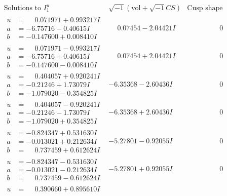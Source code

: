 \documentclass[1p]{elsarticle_modified}
\theoremstyle{definition}
\newcommand{\I}{\sqrt{-1}}
\begin{document}
$$\begin{array}{c|c|c}  
\text{Solutions to }I^u_{1}& \I (\text{vol} + \sqrt{-1}CS) & \text{Cusp shape}\\
 \hline 
\begin{aligned}
u &= \phantom{-}0.071971 + 0.993217 I \\
a &= -6.75716 - 0.40615 I \\
b &= -0.147600 + 0.008410 I\end{aligned}
 & \phantom{-}0.07454 - 2.04421 I & \phantom{-0.000000 } 0 \\ \hline\begin{aligned}
u &= \phantom{-}0.071971 - 0.993217 I \\
a &= -6.75716 + 0.40615 I \\
b &= -0.147600 - 0.008410 I\end{aligned}
 & \phantom{-}0.07454 + 2.04421 I & \phantom{-0.000000 } 0 \\ \hline\begin{aligned}
u &= \phantom{-}0.404057 + 0.920241 I \\
a &= -0.21246 + 1.73079 I \\
b &= -1.079020 - 0.354825 I\end{aligned}
 & -6.35368 - 2.60436 I & \phantom{-0.000000 } 0 \\ \hline\begin{aligned}
u &= \phantom{-}0.404057 - 0.920241 I \\
a &= -0.21246 - 1.73079 I \\
b &= -1.079020 + 0.354825 I\end{aligned}
 & -6.35368 + 2.60436 I & \phantom{-0.000000 } 0 \\ \hline\begin{aligned}
u &= -0.824347 + 0.531630 I \\
a &= -0.013021 + 0.212634 I \\
b &= \phantom{-}0.737459 + 0.612624 I\end{aligned}
 & -5.27801 - 0.92055 I & \phantom{-0.000000 } 0 \\ \hline\begin{aligned}
u &= -0.824347 - 0.531630 I \\
a &= -0.013021 - 0.212634 I \\
b &= \phantom{-}0.737459 - 0.612624 I\end{aligned}
 & -5.27801 + 0.92055 I & \phantom{-0.000000 } 0 \\ \hline\begin{aligned}
u &= \phantom{-}0.390660 + 0.895610 I \\

\end{aligned}
\end{array}$$
\end{document}
